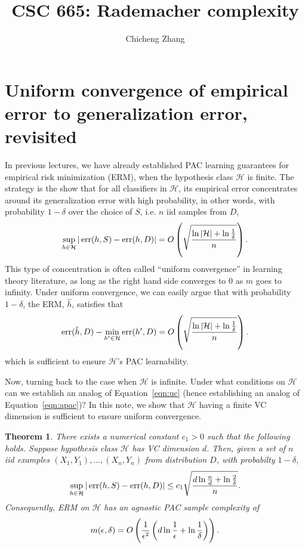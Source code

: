 \documentclass{article}
\title{CSC 665: Rademacher complexity}
\author{Chicheng Zhang}
\newtheorem{theorem}{Theorem}
\DeclareMathOperator*{\err}{{\rm err}}
\newcommand{\Hcal}{\mathcal{H}}
\begin{document}
\maketitle

\section{Uniform convergence of empirical error to generalization error, revisited}

In previous lectures, we have already established PAC learning guarantees for empirical
risk minimization (ERM), when the hypothesis class $\Hcal$ is finite. The strategy is the show
that for all classifiers in $\Hcal$, its empirical error concentrates around its
generalization error with high probability, in other words, with probability $1-\delta$ over the choice of $S$, i.e. $n$ iid samples from $D$,
\begin{equation}
  \sup_{h \in \Hcal} |\err(h, S) - \err(h, D)| = O\del{\sqrt{\frac{\ln|\Hcal| + \ln\frac{1}{\delta}}{n}}}.
  \label{eqn:uc}
\end{equation}
This type of concentration is often called ``uniform convergence'' in learning theory literature, as long as the right hand side converges to $0$ as $m$ goes to infinity. Under uniform convergence,
we can easily argue that with probability $1-\delta$, the ERM, $\hat{h}$, satisfies that
\begin{equation}
  \err(\hat{h}, D) - \min_{h' \in \Hcal} \err(h', D) = O\del{\sqrt{\frac{\ln|\Hcal| + \ln\frac{1}{\delta}}{n}}}.
  \label{eqn:apac}
\end{equation}
which is sufficient to ensure $\Hcal$'s PAC learnability.

Now, turning back to the case when $\Hcal$ is infinite. Under what conditions on
$\Hcal$ can we establish an analog of Equation~\eqref{eqn:uc} (hence establishing an analog of Equation~\eqref{eqn:apac})? In this note, we show that $\Hcal$ having a finite VC dimension is sufficient to ensure uniform convergence.

\begin{theorem}
There exists a numerical constant $c_1 > 0$ such that the following holds.
Suppose hypothesis class $\Hcal$ has VC dimension $d$. Then, given a set of $n$ iid examples $(X_1,Y_1),\ldots,(X_n, Y_n)$ from distribution $D$, with probabilty $1-\delta$,
\begin{equation}
  \sup_{h \in \Hcal} |\err(h, S) - \err(h, D)| \leq c_1 \sqrt{\frac{d\ln\frac{n}{d} + \ln\frac{2}{\delta}}{n}}.
  \label{eqn:uc-vc}
\end{equation}
Consequently, ERM on $\Hcal$ has an agnostic PAC sample complexity of
\[ m(\epsilon, \delta) = O\del{\frac{1}{\epsilon^2}\del{d \ln \frac1\epsilon + \ln\frac1\delta}}. \]
\label{thm:uc-vc-bin}
\end{theorem}
\end{document}
